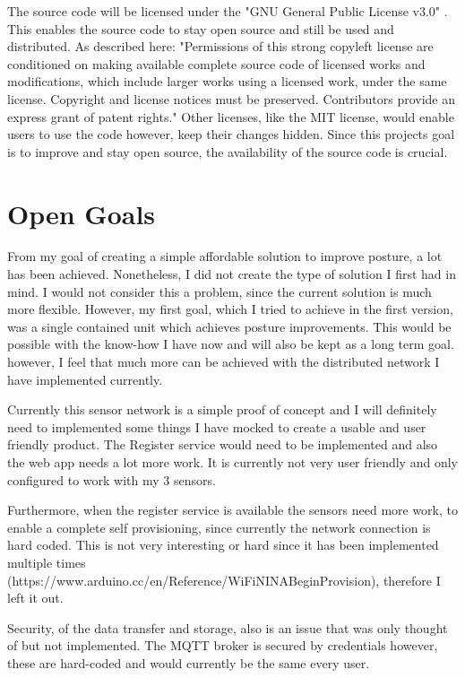 The source code will be licensed under the "GNU General Public License v3.0" \cite{TheGNUGe7:online} \cite{GNUGener3:online}. This enables the source code to stay open source and still be used and distributed. As described here: "Permissions of this strong copyleft license are conditioned on making available complete source code of licensed works and modifications, which include larger works using a licensed work, under the same license. Copyright and license notices must be preserved. Contributors provide an express grant of patent rights." \cite{GNUGener97:online}
Other licenses, like the MIT license, would enable users to use the code however, keep their changes hidden. Since this projects goal is to improve and stay open source, the availability of the source code is crucial. \cite{TheMITLi73:online}

\section{Open Goals}

From my goal of creating a simple affordable solution to improve posture, a lot has been achieved. Nonetheless, I did not create the type of solution I first had in mind. I would not consider this a problem, since the current solution is much more flexible. However, my first goal, which I tried to achieve in the first version, was a single contained unit which achieves posture improvements. This would be possible with the know-how I have now and will also be kept as a long term goal. however, I feel that much more can be achieved with the distributed network I have implemented currently. 

Currently this sensor network is a simple proof of concept and I will definitely need to implemented some things I have mocked to create a usable and user friendly product. The Register service would need to be implemented and also the web app needs a lot more work. It is currently not very user friendly and only configured to work with my 3 sensors. 

Furthermore, when the register service is available the sensors need more work, to enable a complete self provisioning, since currently the network connection is hard coded. This is not very interesting or hard since it has been implemented multiple times (https://www.arduino.cc/en/Reference/WiFiNINABeginProvision), therefore I left it out. 

Security, of the data transfer and storage, also is an issue that was only thought of but not implemented. The MQTT broker is secured by credentials however, these are hard-coded and would currently be the same every user.


